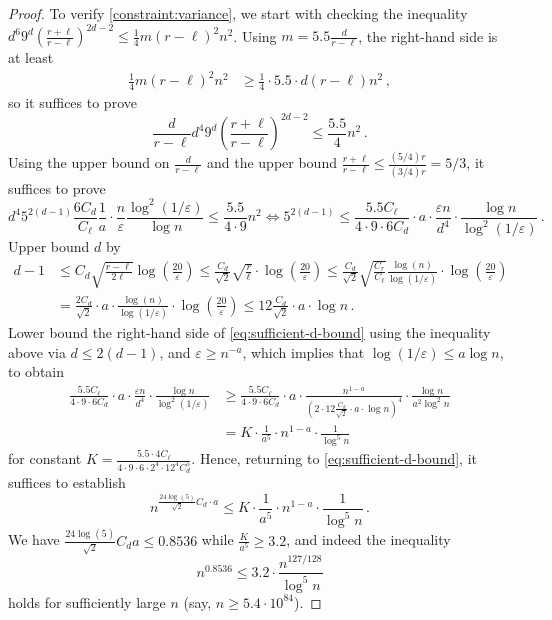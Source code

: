 \documentclass[10pt,a4paper]{article}
\renewcommand{\epsilon}{\varepsilon}
\begin{document}
\begin{proof}
    To verify \cref{constraint:variance}, we start with checking the inequality $d^6 9^d
\left(\frac{r+\ell}{r-\ell}\right)^{2d-2} \leq \tfrac{1}{4} m(r-\ell)^2 n^2$. Using $m = 5.5
\frac{d}{r-\ell}$, the right-hand side is at least
    \begin{align*}
      \frac{1}{4} m (r-\ell)^2 n^2
      &\geq \frac{1}{4} \cdot 5.5 \cdot d (r - \ell) n^2 \,,
    \end{align*}
    so it suffices to prove
    \[
      \frac{d}{r-\ell} d^4 9^d \left(\frac{r+\ell}{r-\ell}\right)^{2d-2} \leq \frac{5.5}{4} n^2 \,.
    \]
    Using the upper bound on $\frac{d}{r-\ell}$ and the upper bound $\tfrac{r+\ell}{r-\ell} \leq
    \tfrac{(5/4)r}{(3/4)r} = 5/3$, it suffices to prove
    \begin{equation}
      \label{eq:sufficient-d-bound}
      d^4 5^{2(d-1)} \frac{6 C_d}{C_\ell} \frac{1}{a} \cdot \frac{n}{\epsilon}
        \frac{\log^2(1/\epsilon)}{\log n} \leq \frac{5.5}{4 \cdot 9} n^2 
      \iff
      5^{2(d-1)} \leq \frac{5.5 C_\ell}{4 \cdot 9 \cdot 6 C_d} \cdot a \cdot
        \frac{\epsilon n}{d^4} \cdot \frac{\log n}{\log^2(1/\epsilon)} \,.
    \end{equation}
    Upper bound $d$ by
    \begin{align*}
        d-1
        &\le C_d \sqrt{\frac{r-\ell}{2\ell}} \log \left(\frac{20}{\epsilon}\right)
        \le \frac{C_d}{\sqrt{2}} \sqrt{\frac{r}{\ell}} \cdot
            \log \left(\frac{20}{\epsilon}\right)
        \le \frac{C_d}{\sqrt{2}} \sqrt{\frac{C_r}{C_\ell}} \frac{\log(n)}{\log(1/\epsilon)}\cdot
            \log \left(\frac{20}{\epsilon}\right) \\
        &= \frac{2 C_d}{\sqrt{2}} \cdot a \cdot \frac{\log(n)}{\log(1/\epsilon)}\cdot
            \log \left(\frac{20}{\epsilon}\right)
        \leq 12\frac{C_d}{\sqrt{2}} \cdot a \cdot \log n \,.
    \end{align*}
    Lower bound the right-hand side of \eqref{eq:sufficient-d-bound} using the inequality above via
    $d \le 2(d-1)$, and $\epsilon \ge n^{-a}$, which implies that $\log(1/\epsilon) \le a \log n$,
    to obtain
    \begin{align*}
        \frac{5.5 C_\ell}{4 \cdot 9 \cdot 6 C_d} \cdot a \cdot
            \frac{\epsilon n}{d^4} \cdot \frac{\log n}{\log^2(1/\epsilon)}
        &\ge \frac{5.5 C_\ell}{4 \cdot 9 \cdot 6 C_d} \cdot a \cdot
            \frac{n^{1-a}}{\left(2 \cdot 12\frac{C_d}{\sqrt{2}} \cdot a \cdot \log n\right)^4}
            \cdot \frac{\log n}{a^2 \log^2 n} \\
        &= K \cdot \frac{1}{a^5} \cdot n^{1-a} \cdot \frac{1}{\log^5 n}
    \end{align*}
    for constant $K = \frac{5.5 \cdot 4 C_\ell}{4 \cdot 9 \cdot 6 \cdot 2^4 \cdot 12^4 C_d^5}$.
    Hence, returning to \eqref{eq:sufficient-d-bound}, it suffices to establish
    \[
      n^{\tfrac{24\log(5)}{\sqrt 2} C_d \cdot a} \leq K \cdot \frac{1}{a^5} \cdot n^{1-a} \cdot
        \frac{1}{\log^5 n} \,.
    \]
    We have $\frac{24 \log(5)}{\sqrt{2}} C_d a \le 0.8536$ while $\frac{K}{a^5} \ge 3.2$, and indeed
    the inequality
    \[
        n^{0.8536} \le 3.2 \cdot \frac{n^{127/128}}{\log^5 n}
    \]
    holds for sufficiently large $n$ (say, $n \ge 5.4 \cdot 10^{84}$).


\end{proof}
\end{document}
